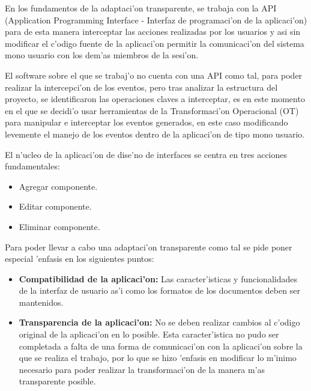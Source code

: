 \medskip
En los fundamentos de la adaptaci'on transparente, se trabaja con la API (Application Programming Interface - Interfaz de programaci'on de la aplicaci'on) para de esta manera interceptar las acciones realizadas por los usuarios y asi sin modificar el c'odigo fuente de la aplicaci'on permitir la comunicaci'on del sistema mono usuario con los dem'as miembros de la sesi'on.

\medskip
El software sobre el que se trabaj'o no cuenta con una API como tal, para poder realizar la intercepci'on de los eventos, pero tras analizar la estructura del proyecto, se identificaron las operaciones claves a interceptar, es en este momento en el que se decidi'o usar herramientas de la Transformaci'on Operacional (OT) para manipular e interceptar los eventos generados, en este caso modificando levemente el manejo de los eventos dentro de la aplicaci'on de tipo mono usuario.

\medskip
El n'ucleo de la aplicaci'on de dise'no de interfaces se centra en tres acciones fundamentales:

\begin{itemize}
	\item Agregar componente.
	\item Editar componente.
	\item Eliminar componente.
\end{itemize}

\medskip
Para poder llevar a cabo una adaptaci'on transparente como tal se pide poner especial 'enfasis en los siguientes puntos:

\begin{itemize}
	\item \textbf{Compatibilidad de la aplicaci'on:} Las caracter'isticas y funcionalidades de la interfaz de usuario as'i como los formatos de los documentos deben ser mantenidos.
	\item \textbf{Transparencia de la aplicaci'on:} No se deben realizar cambios al c'odigo original de la aplicaci'on en lo posible. Esta caracter'istica no pudo ser completada a falta de una forma de comunicaci'on con la aplicaci'on sobre la que se realiza el trabajo, por lo que se hizo 'enfasis en modificar lo m'inimo necesario para poder realizar la transformaci'on de la manera m'as transparente posible.

\end{itemize}
\medskip

